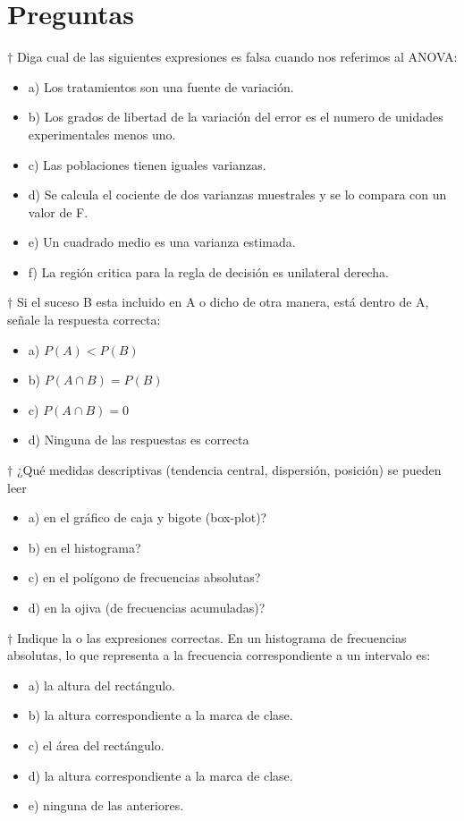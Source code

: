 \documentclass[10pt,a4paper]{article}
\begin{document}
\section{Preguntas}
$\dagger$	Diga cual de las siguientes expresiones es falsa cuando nos referimos al ANOVA:
	\begin{itemize}
		\item a) Los tratamientos son una fuente de variación.
		\item b) Los grados de libertad de la variación del error es el numero de unidades experimentales menos uno.
		\item c) Las poblaciones tienen iguales varianzas.
		\item d) Se calcula el cociente de dos varianzas muestrales y se lo compara con un valor de F.
		\item e) Un cuadrado medio es una varianza estimada.
		\item f) La región critica para la regla de decisión es unilateral derecha.
	\end{itemize}

$\dagger$ Si el suceso B esta incluido en A o dicho de otra manera, está dentro de A, señale la respuesta correcta:
\begin{itemize}
	\item a) $P(A)<P(B)$
	\item b) $P(A\cap B) = P(B)$
	\item c) $P(A\cap B) = 0$
	\item d) Ninguna de las respuestas es correcta 
\end{itemize}

$\dagger$ ¿Qué medidas descriptivas (tendencia central, dispersión, posición) se pueden leer
\begin{itemize}
	\item a) en el gráfico de caja y bigote (box-plot)?
	\item b) en el histograma?
	\item c) en el polígono de frecuencias absolutas?
	\item d) en la ojiva (de frecuencias acumuladas)?
\end{itemize}

$\dagger$ Indique la o las expresiones correctas. En un histograma de frecuencias absolutas, lo que representa a la frecuencia correspondiente a un intervalo es:
\begin{itemize}
	\item a) la altura del rectángulo.
	\item b) la altura correspondiente a la marca de clase.
	\item c) el área del rectángulo.
	\item d) la altura correspondiente a la marca de clase.
	\item e) ninguna de las anteriores.
\end{itemize}
\end{document}
